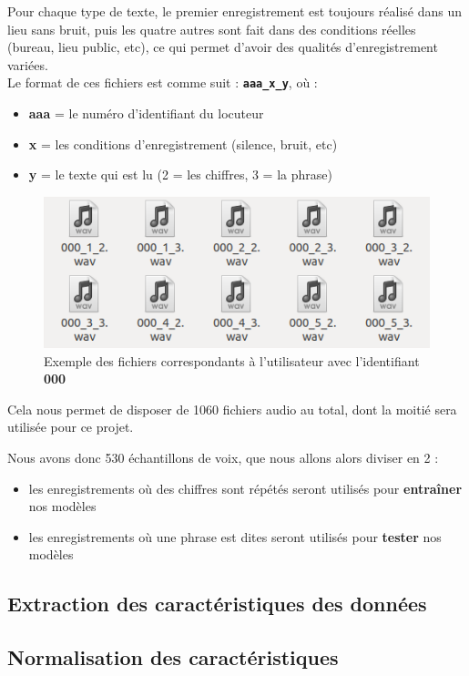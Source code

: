 \documentclass[a4paper, 12pt]{book}
\begin{document}
Pour chaque type de texte, le premier enregistrement est toujours réalisé dans un lieu sans bruit, puis les quatre autres sont fait dans des conditions réelles (bureau, lieu public, etc), ce qui permet d'avoir des qualités d'enregistrement variées.\\

Le format de ces fichiers est comme suit : \textbf{\texttt{aaa\_x\_y}}, où :
\begin{itemize}
  \item \textbf{aaa} = le numéro d'identifiant du locuteur
  \item \textbf{x} = les conditions d'enregistrement (silence, bruit, etc)
  \item \textbf{y} = le texte qui est lu (2 = les chiffres, 3 = la phrase)
\end{itemize}

\begin{figure}[htbp]
  \centering
  \includegraphics[width=0.7\linewidth]{images/voiceSamples.png}
  \caption{Exemple des fichiers correspondants à l'utilisateur avec l'identifiant \textbf{000}}
\end{figure}

Cela nous permet de disposer de 1060 fichiers audio au total, dont la moitié sera utilisée pour ce projet.

Nous avons donc 530 échantillons de voix, que nous allons alors diviser en 2 :
\begin{itemize}
  \item les enregistrements où des chiffres sont répétés seront utilisés pour \textbf{entraîner} nos modèles
  \item les enregistrements où une phrase est dites seront utilisés pour \textbf{tester} nos modèles
\end{itemize}

\subsection{Extraction des caractéristiques des données}

\subsection{Normalisation des caractéristiques}
\end{document}
